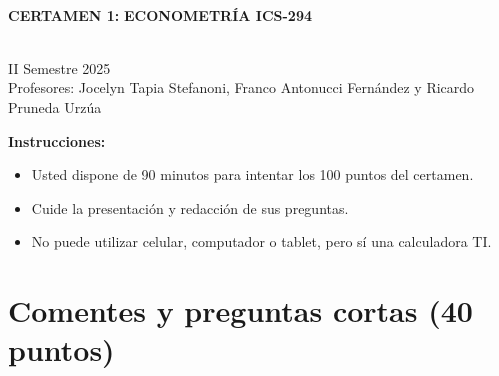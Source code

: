 \documentclass[10pt,a4paper]{article}
\begin{document}
\vspace{5cm}



\begin{center}
\begin{large}
\textbf{\\CERTAMEN 1:}\textbf{ ECONOMETRÍA ICS-294}
\end{large}\\
\vspace{0.2cm}
II Semestre 2025\\
Profesores: Jocelyn Tapia Stefanoni, Franco Antonucci Fernández y Ricardo Pruneda Urz\'ua\\
\end{center}

\textbf{Instrucciones:} 

\begin{itemize}

    \item Usted dispone de 90 minutos  para intentar los 100 puntos del certamen.
    \item Cuide la presentación y redacción de sus preguntas.
    \item No puede utilizar celular, computador o tablet, pero sí una calculadora TI.
     
\end{itemize}

\section{Comentes y preguntas cortas (40 puntos)}
\end{document}
